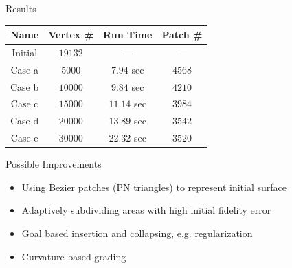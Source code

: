 \documentclass{beamer}
\begin{document}
\begin{frame}[plain]{Results}
  
\begin{table}
  \begin{tabular}{cccc}
    \hline
    Name &Vertex \# &Run Time &Patch \# \\
    \hline
    Initial &$19132$ &--- &--- \\
    Case a &$5000$ &$7.94$ sec &$4568$ \\
    Case b &$10000$ &$9.84$ sec &$4210$ \\
    Case c &$15000$ &$11.14$ sec &$3984$ \\
    Case d &$20000$ &$13.89$ sec &$3542$ \\
    Case e &$30000$ &$22.32$ sec &$3520$ \\
    \hline
  \end{tabular}
\end{table}

\end{frame}


\begin{frame}[plain]{Possible Improvements}
  
  \begin{itemize}
  \item Using Bezier patches (PN triangles) to represent initial surface
  \item Adaptively subdividing areas with high initial fidelity error
  \item Goal based insertion and collapsing, e.g. regularization
  \item Curvature based grading
  \end{itemize}

\end{frame}
\end{document}

